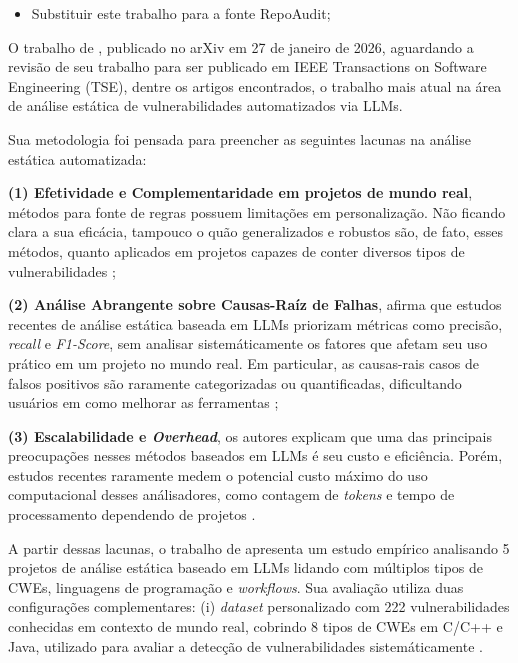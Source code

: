 \documentclass[
    12pt,                %
    openright,           %
    oneside,             %
    a4paper,             %
    english,             %
    brazil               %
]{abntex2}
\begin{document}
\begin{itemize}
\begin{itemize}
  \item Substituir este trabalho para a fonte RepoAudit;
\end{itemize}

\par
O trabalho de , publicado no arXiv em 27 de janeiro de 2026, aguardando a revisão de seu trabalho para ser publicado em IEEE Transactions on Software Engineering (TSE), dentre os artigos encontrados, o trabalho mais atual na área de análise estática de vulnerabilidades automatizados via LLMs.
\par
Sua metodologia foi pensada para preencher as seguintes lacunas na análise estática automatizada: 
\par
\textbf{(1) Efetividade e Complementaridade em projetos de mundo real}, métodos para fonte de regras possuem limitações em personalização. 
Não ficando clara a sua eficácia, tampouco o quão generalizados e robustos são, de fato, esses métodos, quanto aplicados em projetos capazes de conter diversos tipos de vulnerabilidades \cite{li2026llmbased};
\par
\textbf{(2) Análise Abrangente sobre Causas-Raíz de Falhas},  afirma que estudos recentes de análise estática baseada em LLMs priorizam métricas como precisão, \textit{recall} e \textit{F1-Score}, sem analisar sistemáticamente os fatores que afetam seu uso prático em um projeto no mundo real.
Em particular, as causas-rais casos de falsos positivos são raramente categorizadas ou quantificadas, dificultando usuários em como melhorar as ferramentas \cite{li2026llmbased};
\par
\textbf{(3) Escalabilidade e \textit{Overhead}}, os autores explicam que uma das principais preocupações nesses métodos baseados em LLMs é seu custo e eficiência.
Porém, estudos recentes raramente medem o potencial custo máximo do uso computacional desses análisadores, como contagem de \textit{tokens} e tempo de processamento dependendo de projetos \cite{li2026llmbased}.
\par
A partir dessas lacunas, o trabalho de  apresenta um estudo empírico analisando 5 projetos de análise estática baseado em LLMs lidando com múltiplos tipos de CWEs, linguagens de programação e \textit{workflows}.
Sua avaliação utiliza duas configurações complementares: (i) \textit{dataset} personalizado com 222 vulnerabilidades conhecidas em contexto de mundo real, cobrindo 8 tipos de CWEs em C/C++ e Java, utilizado para avaliar a detecção de vulnerabilidades sistemáticamente \cite{li2026llmbased}.

\end{itemize}
\end{document}
